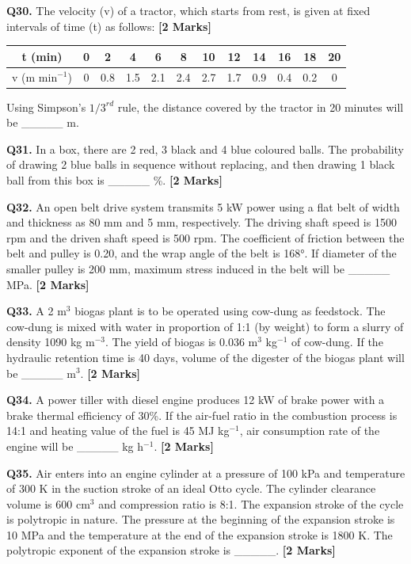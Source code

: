 \documentclass[11pt]{article}
\newcommand{\questionb}[2]{
    \noindent\textbf{Q#2.} #1 \hfill \textbf{[2 Marks]}
}
\begin{document}
\questionb{The velocity (v) of a tractor, which starts from rest, is given at fixed intervals of time (t) as follows:}{30}
\begin{center}
\begin{tabular}{|c|c|c|c|c|c|c|c|c|c|c|c|}
\hline
t (min) & 0 & 2 & 4 & 6 & 8 & 10 & 12 & 14 & 16 & 18 & 20 \\
\hline
v (m min\(^{-1}\)) & 0 & 0.8 & 1.5 & 2.1 & 2.4 & 2.7 & 1.7 & 0.9 & 0.4 & 0.2 & 0 \\
\hline
\end{tabular}
\end{center}
Using Simpson's \(1/3^{rd}\) rule, the distance covered by the tractor in 20 minutes will be \_\_\_\_\_ m.
\vspace{0.5cm}

\questionb{In a box, there are 2 red, 3 black and 4 blue coloured balls. The probability of drawing 2 blue balls in sequence without replacing, and then drawing 1 black ball from this box is \_\_\_\_\_ \%.}{31}
\vspace{0.5cm}

\questionb{An open belt drive system transmits 5 kW power using a flat belt of width and thickness as 80 mm and 5 mm, respectively. The driving shaft speed is 1500 rpm and the driven shaft speed is 500 rpm. The coefficient of friction between the belt and pulley is 0.20, and the wrap angle of the belt is 168°. If diameter of the smaller pulley is 200 mm, maximum stress induced in the belt will be \_\_\_\_\_ MPa.}{32}
\vspace{0.5cm}

\questionb{A 2 m\(^3\) biogas plant is to be operated using cow-dung as feedstock. The cow-dung is mixed with water in proportion of 1:1 (by weight) to form a slurry of density 1090 kg m\(^{-3}\). The yield of biogas is 0.036 m\(^3\) kg\(^{-1}\) of cow-dung. If the hydraulic retention time is 40 days, volume of the digester of the biogas plant will be \_\_\_\_\_ m\(^3\).}{33}
\vspace{0.5cm}

\questionb{A power tiller with diesel engine produces 12 kW of brake power with a brake thermal efficiency of 30\%. If the air-fuel ratio in the combustion process is 14:1 and heating value of the fuel is 45 MJ kg\(^{-1}\), air consumption rate of the engine will be \_\_\_\_\_ kg h\(^{-1}\).}{34}
\vspace{0.5cm}

\questionb{Air enters into an engine cylinder at a pressure of 100 kPa and temperature of 300 K in the suction stroke of an ideal Otto cycle. The cylinder clearance volume is 600 cm\(^3\) and compression ratio is 8:1. The expansion stroke of the cycle is polytropic in nature. The pressure at the beginning of the expansion stroke is 10 MPa and the temperature at the end of the expansion stroke is 1800 K. The polytropic exponent of the expansion stroke is \_\_\_\_\_.}{35}
\vspace{0.5cm}
\end{document}
